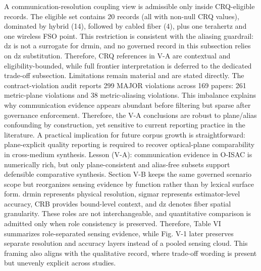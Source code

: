 {}A communication-resolution coupling view is admissible only inside CRQ-eligible records. The eligible set contains 20 records (all with non-null CRQ values), dominated by hybrid (14), followed by cabled fiber (4), plus one terahertz and one wireless FSO point. This restriction is consistent with the aliasing guardrail: dz is not a surrogate for drmin, and no governed record in this subsection relies on dz substitution. Therefore, CRQ references in V-A are contextual and eligibility-bounded, while full frontier interpretation is deferred to the dedicated trade-off subsection.\markdownRendererParagraphSeparator
{}Limitations remain material and are stated directly. The contract-violation audit reports 299 MAJOR violations across 169 papers: 261 metric-plane violations and 38 metric-aliasing violations. This imbalance explains why communication evidence appears abundant before filtering but sparse after governance enforcement. Therefore, the V-A conclusions are robust to plane/alias confounding by construction, yet sensitive to current reporting practice in the literature. A practical implication for future corpus growth is straightforward: plane-explicit quality reporting is required to recover optical-plane comparability in cross-medium synthesis.\markdownRendererParagraphSeparator
{}Lesson (V-A): communication evidence in O-ISAC is numerically rich, but only plane-consistent and alias-free subsets support defensible comparative synthesis.\markdownRendererInterblockSeparator
{}
\markdownRendererSectionEnd \markdownRendererSectionBegin
{}\markdownRendererInterblockSeparator
{}Section V-B keeps the same governed scenario scope but reorganizes sensing evidence by function rather than by lexical surface form. drmin represents physical resolution, sigma\markdownRendererUnderscore{}r represents estimator-level accuracy, CRB provides bound-level context, and dz denotes fiber spatial granularity. These roles are not interchangeable, and quantitative comparison is admitted only when role consistency is preserved. Therefore, Table VI summarizes role-separated sensing evidence, while Fig. V-1 later preserves separate resolution and accuracy layers instead of a pooled sensing cloud. This framing also aligns with the qualitative record, where trade-off wording is present but unevenly explicit across studies.\markdownRendererParagraphSeparator
{}\markdownRendererInterblockSeparator
